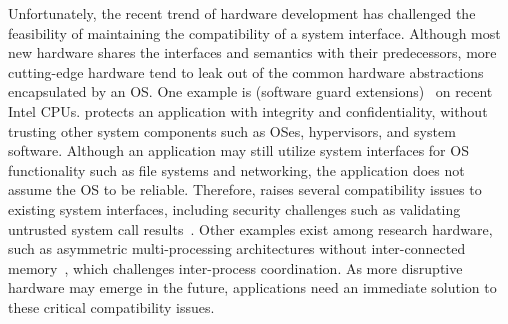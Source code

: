 Unfortunately, the recent trend of hardware development
has challenged the feasibility of maintaining the compatibility of a system interface.
Although most new hardware shares the interfaces and semantics
with their predecessors,
more cutting-edge hardware tend to leak out of
the common hardware abstractions
encapsulated by an OS.
One example is \sgx{} (software guard extensions)~\cite{intelsgx}
on recent Intel CPUs.
\sgx{} protects an application
with integrity and confidentiality, without trusting other system components 
such as OSes, hypervisors, and system software.
Although an \sgx{} application
may still utilize system interfaces for OS functionality
such as file systems and networking, the application does not assume
the OS to be reliable.
Therefore, \sgx{} raises several compatibility issues to
existing system interfaces,
including security challenges such as
validating untrusted system call results~\cite{checkoway13iago}.
Other examples exist among research hardware,
such as asymmetric multi-processing architectures
without inter-connected memory~\cite{gschwind2007,cascaval2002evaluation},
which challenges inter-process coordination.
As more disruptive hardware
may emerge in the future, %
applications need an immediate solution to these critical compatibility issues.



